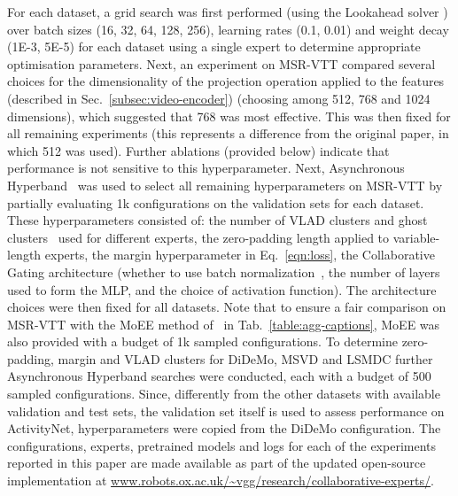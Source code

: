 \documentclass{bmvc2k}
\begin{document}
For each dataset, a grid search was first performed (using the Lookahead solver \cite{zhang2019lookahead,LessWright}) over batch sizes (16, 32, 64, 128, 256), learning rates (0.1, 0.01) and weight decay (1E-3, 5E-5) for each dataset using a single expert to determine appropriate optimisation parameters.  Next, an experiment on MSR-VTT compared several choices for the dimensionality of the projection operation applied to the features (described in Sec.~\ref{subsec:video-encoder}) (choosing among 512, 768 and 1024 dimensions), which suggested that 768 was most effective.  This was then fixed for all remaining experiments (this represents a difference from the original paper, in which 512 was used). Further ablations (provided below) indicate that performance is not sensitive to this hyperparameter.  Next, Asynchronous Hyperband~\cite{li2018massively} was used to select all remaining hyperparameters on MSR-VTT by partially evaluating 1k configurations on the validation sets for each dataset.  These hyperparameters consisted of: the number of VLAD clusters and ghost clusters~\cite{zhong2018ghostvlad} used for different experts, the zero-padding length applied to variable-length experts, the margin hyperparameter  in Eq.~\ref{eqn:loss}, the Collaborative Gating architecture (whether to use batch normalization~\cite{ioffe2015batch}, the number of layers used to form the MLP, and the choice of activation function).  The architecture choices were then fixed for all datasets.  Note that to ensure a fair comparison on MSR-VTT with the MoEE method of~\cite{miech2018learning} in Tab.~\ref{table:agg-captions}, MoEE was also provided with a budget of 1k sampled configurations. To determine zero-padding, margin and VLAD clusters for DiDeMo, MSVD and LSMDC further Asynchronous Hyperband searches were conducted, each with a budget of 500 sampled configurations.  Since, differently from the other datasets with available validation and test sets, the validation set itself is used to assess performance on ActivityNet, hyperparameters were copied from the DiDeMo configuration.  The configurations, experts, pretrained models and logs for each of the experiments reported in this paper are made available as part of the updated open-source implementation at \url{www.robots.ox.ac.uk/~vgg/research/collaborative-experts/}. 
\end{document}
